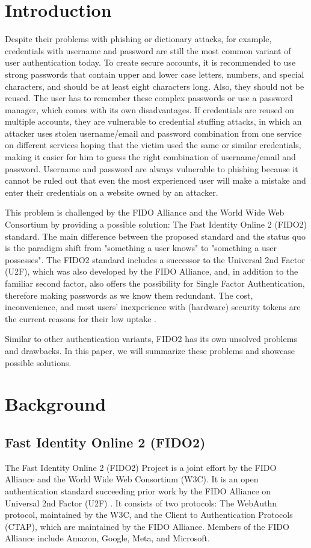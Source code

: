 \documentclass[runningheads]{llncs}
\begin{document}
\section{Introduction}
Despite their problems with phishing or dictionary attacks, for example, credentials with username and password are still the most common variant of user authentication today. To create secure accounts, it is recommended to use strong passwords that contain upper and lower case letters, numbers, and special characters, and should be at least eight characters long. Also, they should not be reused. The user has to remember these complex passwords or use a password manager, which comes with its own disadvantages. If credentials are reused on multiple accounts, they are vulnerable to credential stuffing attacks, in which an attacker uses stolen username/email and password combination from one service on different services hoping that the victim used the same or similar credentials, making it easier for him to guess the right combination of username/email and password. Username and password are always vulnerable to phishing because it cannot be ruled out that even the most experienced user will make a mistake and enter their credentials on a website owned by an attacker.

This problem is challenged by the FIDO Alliance and the World Wide Web Consortium by providing a possible solution: The Fast Identity Online 2 (FIDO2) standard. The main difference between the proposed standard and the status quo is the paradigm shift from "something a user knows" to "something a user possesses". The FIDO2 standard includes a successor to the Universal 2nd Factor (U2F), which was also developed by the FIDO Alliance, and, in addition to the familiar second factor, also offers the possibility for Single Factor Authentication, therefore making passwords as we know them redundant. The cost, inconvenience, and most users' inexperience with (hardware) security tokens are the current reasons for their low uptake \cite{274547}\cite{9152694}.

Similar to other authentication variants, FIDO2 has its own unsolved problems and drawbacks. In this paper, we will summarize these problems and showcase possible solutions. 

\section{Background}
\subsection{Fast Identity Online 2 (FIDO2)}
The Fast Identity Online 2 (FIDO2) Project is a joint effort by the FIDO Alliance and the World Wide Web Consortium (W3C). It is an open authentication standard succeeding prior work by the FIDO Alliance on Universal 2nd Factor (U2F) \cite{9152694}. It consists of two protocols: The WebAuthn protocol, maintained by the W3C, and the Client to Authentication Protocols (CTAP), which are maintained by the FIDO Alliance. Members of the FIDO Alliance include Amazon, Google, Meta, and Microsoft.
\end{document}
